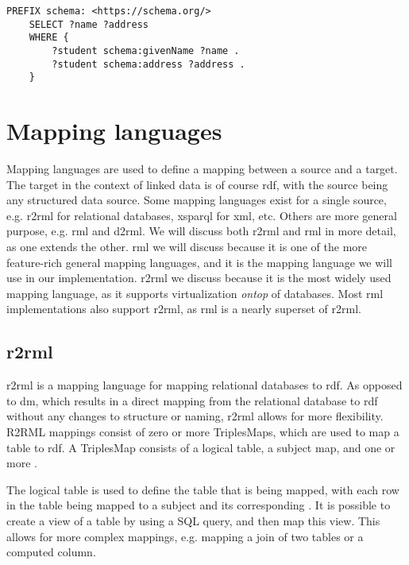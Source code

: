 \begin{lstlisting}[language=SPARQL, caption={Example of a basic \acrshort{sparql} SELECT query}, label={lst:sparql_select_query}, captionpos=b]
    PREFIX schema: <https://schema.org/>
    SELECT ?name ?address
    WHERE {
        ?student schema:givenName ?name .
        ?student schema:address ?address .
    }
\end{lstlisting}

\section{Mapping languages}
Mapping languages are used to define a mapping between a source and a target. The target in the context of linked data is of course \acrshort{rdf}, with the source being any structured data source. Some mapping languages exist for a single source, e.g. \acrfull{r2rml} for relational databases, \acrfull{xsparql} for \acrshort{xml}, etc. Others are more general purpose, e.g. \acrfull{rml} and \acrfull{d2rml}. 
We will discuss both \acrshort{r2rml} and \acrshort{rml} in more detail, as one extends the other. \acrshort{rml} we will discuss because it is one of the more feature-rich general mapping languages, and it is the mapping language we will use in our implementation. \acrshort{r2rml} we discuss because it is the most widely used mapping language, as it supports virtualization \textit{ontop} of databases. %
Most \acrshort{rml} implementations also support \acrshort{r2rml}, as \acrshort{rml} is a nearly superset of \acrshort{r2rml}. 

\subsection{\acrshort{r2rml}}
\acrfull{r2rml} is a mapping language for mapping relational databases to \acrshort{rdf}. As opposed to \acrfull{dm}, which results in a direct mapping from the relational database to \acrshort{rdf} without any changes to structure or naming, \acrshort{r2rml} allows for more flexibility. R2RML mappings consist of zero or more TriplesMaps, which are used to map a table to \acrshort{rdf}. A TriplesMap consists of a logical table, a subject map, and one or more . 

The logical table is used to define the table that is being mapped, with each row in the table being mapped to a subject and its corresponding . It is possible to create a view of a table by using a SQL query, and then map this view. This allows for more complex mappings, e.g. mapping a join of two tables or a computed column. 

